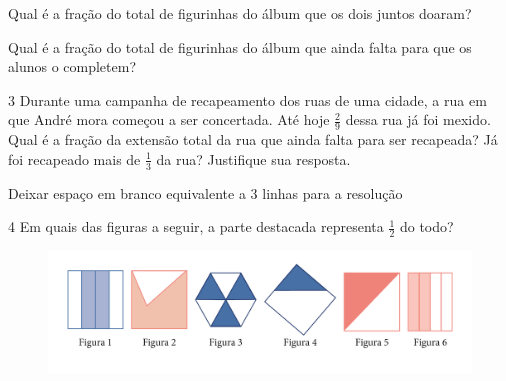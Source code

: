 \begin{escolha}
\item
  Qual é a fração do total de figurinhas do álbum que os dois juntos doaram?

\bigskip

\item
  Qual é a fração do total de figurinhas do álbum que ainda falta para que os alunos o completem?

\bigskip
\end{escolha}


\num{3} Durante uma campanha de recapeamento dos ruas de uma cidade, a rua em
que André mora começou a ser concertada. Até hoje $\frac{2}{9}$ dessa rua já foi mexido.
Qual é a fração da extensão total da rua que ainda falta para ser
recapeada? Já foi recapeado mais de $\frac{1}{3}$ da rua? Justifique sua resposta.

Deixar espaço em branco equivalente a 3 linhas para a resolução

\begin{mdframed}[linewidth=2pt,linecolor=salmao,roundcorner=2pt]

\vspace{2cm}
\end{mdframed}

\num{4} Em quais das figuras a seguir, a parte destacada representa $\frac{1}{2}$ do todo?

\begin{figure}[htpb!]
\centering
\includegraphics[width=\textwidth]{media/image52.png}
\end{figure}



